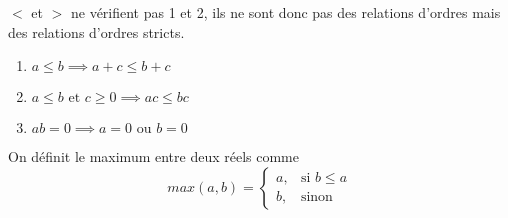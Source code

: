 \documentclass[a4paper, 12pt]{article}
\begin{document}
\begin{remarque}
    $\lt$ et $\gt$ ne vérifient pas 1 et 2, ils ne sont donc pas des relations d'ordres mais des relations d'ordres stricts.
\end{remarque}

\begin{propriete}{}{}
    \begin{enumerate}
        \item $a \leq b \implies a + c \leq b + c$
        \item $a \leq b \text{ et } c \geq 0 \implies ac \leq bc$
        \item $ab = 0 \implies a = 0 \text{ ou } b = 0$
    \end{enumerate}
\end{propriete}

On définit le maximum entre deux réels comme
\begin{equation*}
    max(a, b) =
    \begin{cases}
        a, & \text{si } b \leq a \\
        b, & \text{sinon}
    \end{cases}
\end{equation*}
\end{document}
